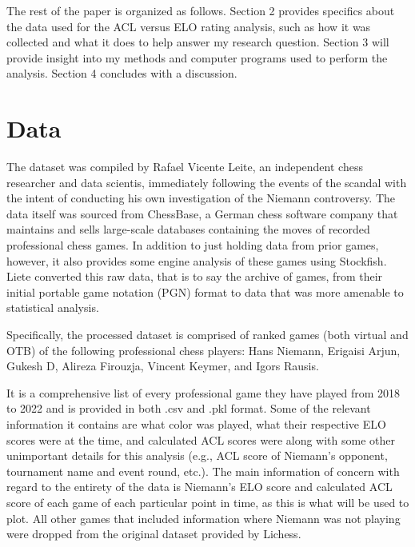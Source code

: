 \documentclass[12pt, letterpaper, titlepage]{article}
\begin{document}
The rest of the paper is organized as follows. Section 2 provides specifics about the data used for the ACL versus ELO rating analysis, such as how it was collected and what it does to help answer my research question. Section 3 will provide insight into my methods and computer programs used to perform the analysis. Section 4 concludes with a discussion.

\section*{Data}
\label{sec:data}

The dataset was compiled by Rafael Vicente Leite, an independent chess researcher and data scientis, immediately following the events of the scandal with the intent of conducting his own investigation of the Niemann controversy. The data itself was sourced from ChessBase, a German chess software company that maintains and sells large-scale databases containing the moves of recorded professional chess games. In addition to just holding data from prior games, however, it also provides some engine analysis of these games using Stockfish. Liete converted this raw data, that is to say the archive of games, from their initial portable game notation (PGN) format to data that was more amenable to statistical analysis.

Specifically, the processed dataset is comprised of ranked games (both virtual and OTB) of the following professional chess players: Hans Niemann, Erigaisi Arjun, Gukesh D, Alireza Firouzja, Vincent Keymer, and Igors Rausis.

It is a comprehensive list of every professional game they have played from 2018 to 2022 and is provided in both .csv and .pkl format. Some of the relevant information it contains are what color was played, what their respective ELO scores were at the time, and calculated ACL scores were along with some other unimportant details for this analysis (e.g., ACL score of Niemann's opponent, tournament name and event round, etc.). The main information of concern with regard to the entirety of the data is Niemann's ELO score and calculated ACL score of each game of each particular point in time, as this is what will be used to plot. All other games that included information where Niemann was not playing were dropped from the original dataset provided by Lichess.
\end{document}
